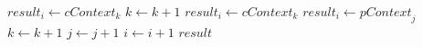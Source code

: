 \documentclass{bmcart}
\begin{document}
\begin{backmatter}
\begin{algorithm}
\begin{algorithmic}[1]
		\EndCase
		 
		\State $\textit{result}_i \gets \textit{cContext}_k$
		\State $\textit{k} \gets \textit{k} + 1$
		\EndCase
		 
		\State $\textit{result}_i \gets \textit{cContext}_k$
		\Else
		\State $\textit{result}_i \gets \textit{pContext}_j$
		\EndIf
		\State $\textit{k} \gets \textit{k} + 1$
		\EndCase
		\EndSwitch
		\State $\textit{j} \gets \textit{j} + 1$
		\EndCase
		\EndSwitch
		\EndIf
		\State $\textit{i} \gets \textit{i} + 1$
		\EndFor
		\Return $\textit{result}$
		\EndFunction
	\end{algorithmic}
\end{algorithm}

\restoregeometry

\end{backmatter}
\end{document}
